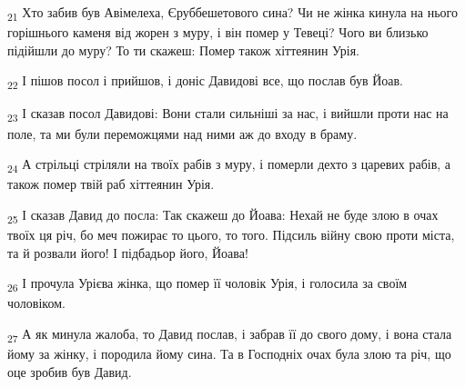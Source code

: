 \begin{tcolorbox}
\textsubscript{21} Хто забив був Авімелеха, Єруббешетового сина? Чи не жінка кинула на нього горішнього каменя від жорен з муру, і він помер у Тевеці? Чого ви близько підійшли до муру? То ти скажеш: Помер також хіттеянин Урія.
\end{tcolorbox}
\begin{tcolorbox}
\textsubscript{22} І пішов посол і прийшов, і доніс Давидові все, що послав був Йоав.
\end{tcolorbox}
\begin{tcolorbox}
\textsubscript{23} І сказав посол Давидові: Вони стали сильніші за нас, і вийшли проти нас на поле, та ми були переможцями над ними аж до входу в браму.
\end{tcolorbox}
\begin{tcolorbox}
\textsubscript{24} А стрільці стріляли на твоїх рабів з муру, і померли дехто з царевих рабів, а також помер твій раб хіттеянин Урія.
\end{tcolorbox}
\begin{tcolorbox}
\textsubscript{25} І сказав Давид до посла: Так скажеш до Йоава: Нехай не буде злою в очах твоїх ця річ, бо меч пожирає то цього, то того. Підсиль війну свою проти міста, та й розвали його! І підбадьор його, Йоава!
\end{tcolorbox}
\begin{tcolorbox}
\textsubscript{26} І прочула Урієва жінка, що помер її чоловік Урія, і голосила за своїм чоловіком.
\end{tcolorbox}
\begin{tcolorbox}
\textsubscript{27} А як минула жалоба, то Давид послав, і забрав її до свого дому, і вона стала йому за жінку, і породила йому сина. Та в Господніх очах була злою та річ, що оце зробив був Давид.
\end{tcolorbox}
